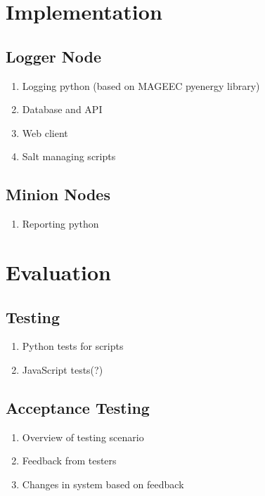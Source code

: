 \documentclass{l4proj}
\begin{document}
\chapter{Implementation}
\label{chap_implementation}
\section{Logger Node}
\begin{enumerate}
	\item Logging python (based on MAGEEC pyenergy library)
	\item Database and API
	\item Web client
	\item Salt managing scripts
\end{enumerate}
\section{Minion Nodes}
\begin{enumerate}
	\item Reporting python
\end{enumerate}

\chapter{Evaluation}
\section{Testing}
\begin{enumerate}
	\item Python tests for scripts
	\item JavaScript tests(?)
\end{enumerate}
\section{Acceptance Testing}
\begin{enumerate}
	\item Overview of testing scenario
	\item Feedback from testers
	\item Changes in system based on feedback
\end{enumerate}

\end{document}

